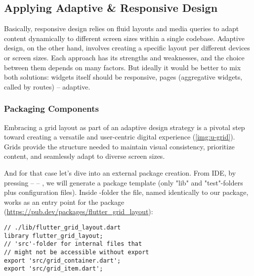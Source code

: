 
\subsection{Applying Adaptive \& Responsive Design}

Basically, responsive design relies on fluid layouts and media queries to adapt content dynamically to different screen 
sizes within a single codebase. Adaptive design, on the other hand, involves creating a specific layout per different 
devices or screen sizes. Each approach has its strengths and weaknesses, and the choice between them depends on many 
factors. But ideally it would be better to mix both solutions: widgets itself should be responsive, pages (aggregative 
widgets, called by routes) -- adaptive.


\subsubsection{Packaging Components}

Embracing a grid layout as part of an adaptive design strategy is a pivotal step toward creating a versatile and 
user-centric digital experience (\cref{img:u-grid}). Grids provide the structure needed to maintain visual consistency, 
prioritize content, and seamlessly adapt to diverse screen sizes.


And for that case let's dive into an external package creation. From IDE, by pressing  --  -- , we will generate a package template (only "lib" and "test"-folders plus configuration files). 
Inside -folder the file, named identically to our package, works as an entry point for the package
(\href{https://pub.dev/packages/flutter_grid_layout}{https://pub.dev/packages/flutter\_grid\_layout}):

\begin{lstlisting}
// ./lib/flutter_grid_layout.dart
library flutter_grid_layout;
// 'src'-folder for internal files that 
// might not be accessible without export
export 'src/grid_container.dart';
export 'src/grid_item.dart';
\end{lstlisting}

